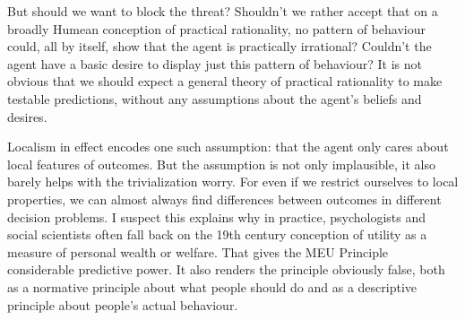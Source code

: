 But should we want to block the threat? Shouldn't we rather accept that on
a broadly Humean conception of practical rationality, no pattern of
behaviour could, all by itself, show that the agent is practically
irrational? Couldn't the agent have a basic desire to display just
this pattern of behaviour? It is not obvious that we should expect a
general theory of practical rationality to make testable predictions,
without any assumptions about the agent's beliefs and desires.

Localism in effect encodes one such assumption: that the agent only
cares about local features of outcomes. But the assumption is not only
implausible, it also barely helps with the trivialization worry. For
even if we restrict ourselves to local properties, we can almost
always find differences between outcomes in different decision
problems. I suspect this explains why in practice, psychologists and
social scientists often fall back on the 19th century conception of
utility as a measure of personal wealth or welfare. That gives the MEU
Principle considerable predictive power. It also renders the principle
obviously false, both as a normative principle about what people
should do and as a descriptive principle about people's actual
behaviour.




